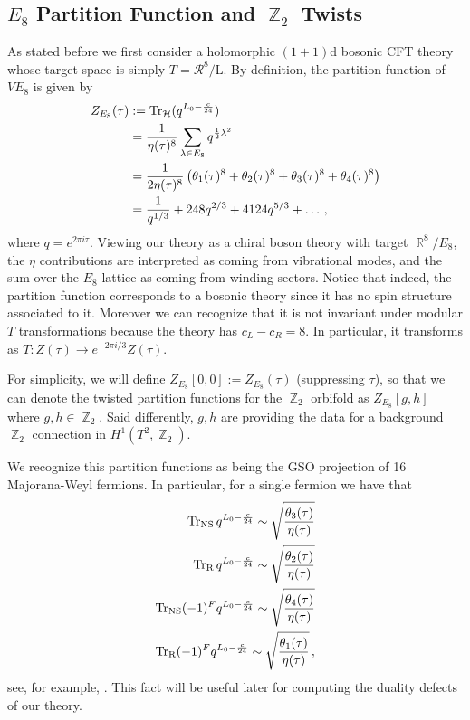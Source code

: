 \documentclass{article}
\DeclareMathOperator{\bbZ}{\mathbb{Z}}
\DeclareMathOperator{\bbR}{\mathbb{R}}
\begin{document}
\subsection{\texorpdfstring{$E_8$}{E8} Partition Function and \texorpdfstring{$\bbZ_2$}{Z2} Twists}
As stated before we first consider a holomorphic $(1 + 1)$d bosonic CFT theory whose target space is simply $T = \mathcal{R}^8/$L. By definition, the partition function of $VE_8$ is given by
\begin{align}
    Z_{E_8}(\tau)
        &:= \Tr_{\mathcal{H}}(q^{L_0-\frac{c}{24}})\\
        &= \frac{1}{\eta(\tau)^8} \sum_{\lambda \in E_8} q^{\frac{1}{2}\lambda^2}\\
        &= \frac{1}{2\eta(\tau)^8} \left(\theta_1(\tau)^8 + \theta_2(\tau)^8 + \theta_3(\tau)^8 + \theta_4(\tau)^8\right)\\
        &= \frac{1}{q^{1/3}} + 248 q^{2/3} + 4124 q^{5/3} + \dots\,,
\end{align}
where $q=e^{2\pi i \tau}$. Viewing our theory as a chiral boson theory with target $\bbR^8/E_8$, the $\eta$ contributions are interpreted as coming from vibrational modes, and the sum over the $E_8$ lattice as coming from winding sectors. Notice that indeed, the partition function corresponds to a bosonic theory since it has no spin structure associated to it. Moreover we can recognize that it is not invariant under modular $T$ transformations because the theory has $c_L-c_R=8$. In particular, it transforms as $T:Z(\tau) \to e^{-2\pi i/3} Z(\tau)$.
\vspace{2mm}

For simplicity, we will define $Z_{E_8}[0,0] := Z_{E_8}(\tau)$ (suppressing $\tau$), so that we can denote the twisted partition functions for the $\bbZ_2$ orbifold as $Z_{E_8}[g,h]$ where $g,h\in\bbZ_2$. Said differently, $g,h$ are providing the data for a background $\bbZ_2$ connection in $H^1(T^2,\bbZ_2)$.

We recognize this partition functions as being the GSO projection of 16 Majorana-Weyl fermions. In particular, for a single fermion we have that
\begin{align}
    \Tr_{\textrm{NS}} q^{L_0 - \frac{c}{24}} \sim \sqrt{\frac{\theta_3(\tau)}{\eta(\tau)}}\\
    \Tr_{\textrm{R}} q^{L_0 - \frac{c}{24}} \sim \sqrt{\frac{\theta_2(\tau)}{\eta(\tau)}}\\
    \Tr_{\textrm{NS}} (-1)^F q^{L_0 - \frac{c}{24}} \sim \sqrt{\frac{\theta_4(\tau)}{\eta(\tau)}}\\
    \Tr_{\textrm{R}} (-1)^F q^{L_0 - \frac{c}{24}} \sim \sqrt{\frac{\theta_1(\tau)}{\eta(\tau)}}\,,
\end{align}
see, for example, \cite{seibergWitten:spinStructInString}. This fact will be useful later for computing the duality defects of our theory.
\end{document}
